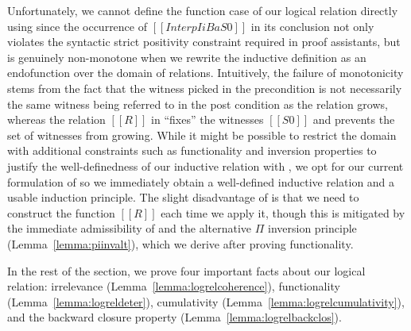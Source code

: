 \documentclass[acmsmall,screen=true,
\ifpublic review=false\else,review=true\fi
  ,anonymous=\ifanonymous true\else false\fi]{acmart}
\begin{document}
Unfortunately, we cannot define the function case of our logical
relation directly using  since the occurrence of
$[[Interp I i B {a} S0]]$ in its conclusion not only violates the
syntactic strict positivity constraint required in proof assistants,
but is genuinely non-monotone when we rewrite the inductive definition
as an endofunction over the domain of relations.
Intuitively, the failure of monotonicity stems from the fact
that the witness picked in the precondition is not necessarily the
same witness being referred to in the post condition as the relation
grows, whereas the
relation $[[R]]$ in  ``fixes'' the witnesses $[[S0]]$ and
prevents the set of witnesses from growing. While it might
be possible to restrict the domain with additional constraints such as
functionality and inversion properties to justify the well-definedness of our
inductive relation with , we opt for our current
formulation of  so we immediately obtain a
well-defined inductive relation and a usable induction principle. The
slight disadvantage of  is that we need to construct the
function $[[R]]$ each time we apply it, though this is mitigated by
the immediate admissibility of  and the alternative $\Pi$ inversion
principle (Lemma~\ref{lemma:piinvalt}), which we derive after proving functionality.


In the rest of the section, we prove four important facts about
our logical relation: irrelevance (Lemma~\ref{lemma:logrelcoherence}),
functionality (Lemma~\ref{lemma:logreldeter}), cumulativity
(Lemma~\ref{lemma:logrelcumulativity}), and the backward closure
property (Lemma~\ref{lemma:logrelbackclos}).
\end{document}
